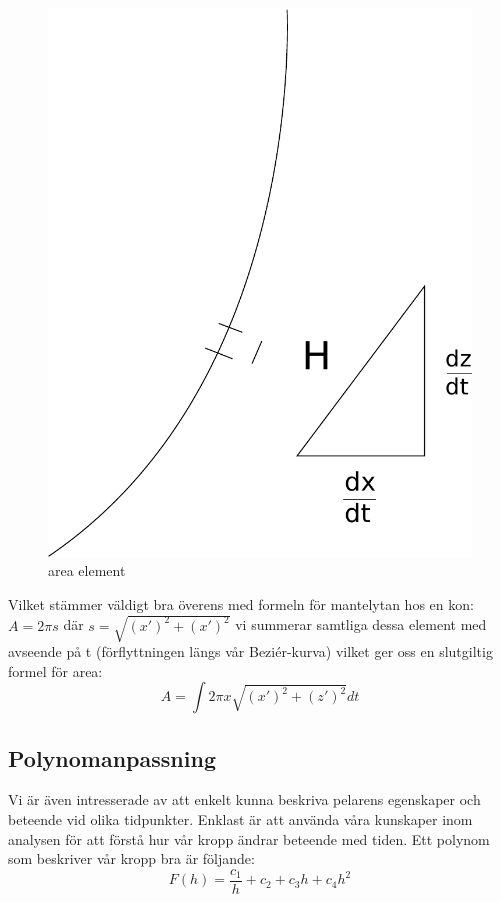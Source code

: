 \documentclass[a4paper,10pt]{article}
\begin{document}
\begin{figure}[htp]
\centering
\includegraphics[scale=0.5]{area}
\caption{area element}\label{fig:area}
\end{figure}

Vilket stämmer väldigt bra överens med formeln för mantelytan hos en kon: $ A=2\pi s $ där $ s = \sqrt{(x')^2+(x')^2} $ vi summerar samtliga dessa element med avseende på t (förflyttningen längs vår Beziér-kurva) vilket ger oss en slutgiltig formel för area:
$$A=\int 2\pi x \sqrt{(x')^2 + (z')^2}  dt $$

\subsection{Polynomanpassning}
Vi är även intresserade av att enkelt kunna beskriva pelarens egenskaper och beteende vid olika tidpunkter. Enklast är att använda våra kunskaper inom analysen för att förstå hur vår kropp ändrar beteende med tiden. Ett polynom som beskriver vår kropp bra är följande:
$$F(h)=\frac{c_1}{h}+c_2 + c_3 h + c_4 h^2 $$
\end{document}
